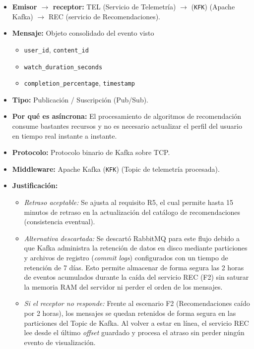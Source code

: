\begin{itemize}
    \item \textbf{Emisor $\rightarrow$ receptor:}
    TEL (Servicio de Telemetría) $\rightarrow$ (\texttt{KFK}) (Apache Kafka) $\rightarrow$ REC (servicio de Recomendaciones).

    \item \textbf{Mensaje:}
    Objeto consolidado del evento visto 
    \begin{itemize}
        \item \texttt{user\_id}, \texttt{content\_id}
        \item \texttt{watch\_duration\_seconds}
        \item \texttt{completion\_percentage}, \texttt{timestamp}
    \end{itemize}
    
    \item \textbf{Tipo:}
    Publicación / Suscripción (Pub/Sub).

    \item \textbf{Por qué es asíncrona:}
    El procesamiento de algoritmos de recomendación consume bastantes recursos y no es necesario actualizar el perfil del usuario en tiempo real instante a instante.

    \item \textbf{Protocolo:}
    Protocolo binario de Kafka sobre TCP.

    \item \textbf{Middleware:}
    Apache Kafka (\texttt{KFK}) (Topic de telemetría procesada).

    \item \textbf{Justificación:}
    \begin{itemize}
        \item \textit{Retraso aceptable:}
        Se ajusta al requisito R5, el cual permite hasta 15 minutos de retraso en la actualización del catálogo de recomendaciones (consistencia eventual).

        \item \textit{Alternativa descartada:}
        Se descartó RabbitMQ para este flujo debido a que Kafka administra la retención de datos en disco mediante particiones y archivos de registro (\textit{commit logs}) configurados con un tiempo de retención de 7 días.
        Esto permite almacenar de forma segura las 2 horas de eventos acumulados durante la caída del servicio REC (F2) sin saturar la memoria RAM del servidor ni perder el orden de los mensajes.


        \item \textit{Si el receptor no responde:}
        Frente al escenario F2 (Recomendaciones caído por 2 horas), los mensajes se quedan retenidos de forma segura en las particiones del Topic de Kafka. Al volver
         a estar en línea, el servicio REC lee desde el último \textit{offset} guardado y procesa el atraso sin perder ningún evento de visualización.
    \end{itemize}
\end{itemize}

